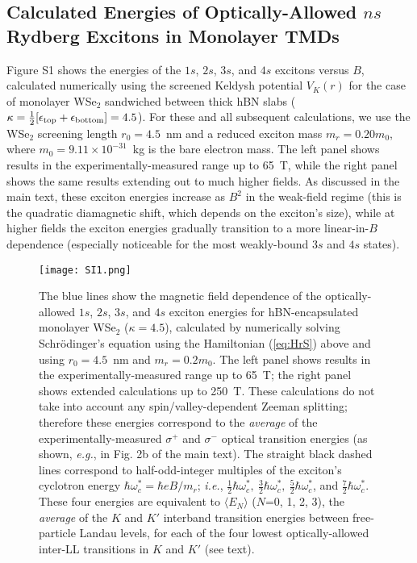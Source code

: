 \documentclass[aps,prl,twocolumn]{revtex4-1}
\begin{document}
\subsection{Calculated Energies of Optically-Allowed $ns$ Rydberg Excitons in Monolayer TMDs}

Figure S1 shows the energies of the $1s$, $2s$, $3s$, and $4s$ excitons versus $B$, calculated numerically using the screened Keldysh potential $V_K(r)$ for the case of monolayer WSe$_2$ sandwiched between thick hBN slabs ($\kappa=\frac{1}{2}[\epsilon_{\rm top}+\epsilon_{\rm bottom}]=4.5$). For these and all subsequent calculations, we use the WSe$_2$ screening length $r_0 = 4.5$~nm and a reduced exciton mass $m_r=0.20 m_0$, where $m_0=9.11 \times 10^{-31}$~kg is the bare electron mass. The left panel shows results in the experimentally-measured range up to 65~T, while the right panel shows the same results extending out to much higher fields.  As discussed in the main text, these exciton energies increase as $B^2$ in the weak-field regime (this is the quadratic diamagnetic shift, which depends on the exciton's size), while at higher fields the exciton energies gradually transition to a more linear-in-$B$ dependence (especially noticeable for the most weakly-bound $3s$ and $4s$ states).
%
\begin{figure*}[h]
\center
\texttt{[image: SI1.png]}
\caption{The blue lines show the magnetic field dependence of the optically-allowed $1s$, $2s$, $3s$, and $4s$ exciton energies for hBN-encapsulated monolayer WSe$_2$ ($\kappa = 4.5$), calculated by numerically solving Schr\"{o}dinger's equation using the Hamiltonian (\ref{eq:HrS}) above and using $r_0 = 4.5$~nm and $m_r=0.2 m_0$. The left panel shows results in the experimentally-measured range up to 65~T; the right panel shows extended calculations up to 250~T. These calculations do not take into account any spin/valley-dependent Zeeman splitting; therefore these energies correspond to the \textit{average} of the experimentally-measured $\sigma^+$ and $\sigma^-$ optical transition energies (as shown, \textit{e.g.}, in Fig. 2b of the main text).  The straight black dashed lines correspond to half-odd-integer multiples of the exciton's cyclotron energy $\hbar \omega_c^* = \hbar e B/m_r$; \textit{i.e.}, $\frac{1}{2}\hbar \omega_c^*,~\frac{3}{2}\hbar \omega_c^*,~\frac{5}{2}\hbar \omega_c^*$, and $\frac{7}{2}\hbar \omega_c^*$. These four energies are equivalent to $\langle E_N \rangle$ ($N$=0, 1, 2, 3), the \textit{average} of the $K$ and $K'$ interband transition energies between free-particle Landau levels, for each of the four lowest optically-allowed inter-LL transitions in $K$ and $K'$ (see text).} \label{fig1}
\end{figure*}
\end{document}
